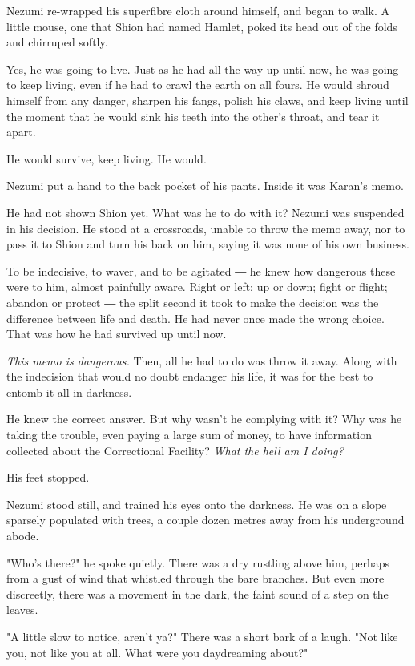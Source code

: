Nezumi re-wrapped his superfibre cloth around himself, and began to
walk. A little mouse, one that Shion had named Hamlet, poked its head
out of the folds and chirruped softly.

Yes, he was going to live. Just as he had all the way up until now, he
was going to keep living, even if he had to crawl the earth on all
fours. He would shroud himself from any danger, sharpen his fangs,
polish his claws, and keep living until the moment that he would sink
his teeth into the other's throat, and tear it apart.

He would survive, keep living. He would.

Nezumi put a hand to the back pocket of his pants. Inside it was Karan's
memo.


He had not shown Shion yet. What was he to do with it? Nezumi was
suspended in his decision. He stood at a crossroads, unable to throw the
memo away, nor to pass it to Shion and turn his back on him, saying it
was none of his own business.

To be indecisive, to waver, and to be agitated ― he knew how dangerous
these were to him, almost painfully aware. Right or left; up or down;
fight or flight; abandon or protect ― the split second it took to make
the decision was the difference between life and death. He had never
once made the wrong choice. That was how he had survived up until now.

\emph{This memo is dangerous.} Then, all he had to do was throw it away. Along
with the indecision that would no doubt endanger his life, it was for
the best to entomb it all in darkness.

He knew the correct answer. But why wasn't he complying with it? Why was
he taking the trouble, even paying a large sum of money, to have
information collected about the Correctional Facility? \emph{What the hell am
I doing?}

His feet stopped.

Nezumi stood still, and trained his eyes onto the darkness. He was on a
slope sparsely populated with trees, a couple dozen metres away from his
underground abode.

"Who's there?" he spoke quietly. There was a dry rustling above him,
perhaps from a gust of wind that whistled through the bare branches. But
even more discreetly, there was a movement in the dark, the faint sound
of a step on the leaves.

"A little slow to notice, aren't ya?" There was a short bark of a laugh.
"Not like you, not like you at all. What were you daydreaming about?"


